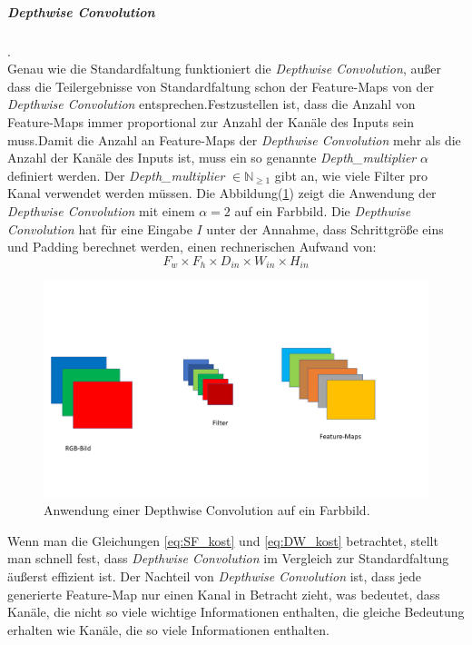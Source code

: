 \documentclass[12pt,a4paper]{scrartcl}
\numberwithin{equation}{section}
\newcommand{\N}{\mathbb{N}} %
\begin{document}
\subparagraph{Depthwise Convolution}.\\
Genau wie die Standardfaltung funktioniert die \textit{Depthwise Convolution}, außer dass die Teilergebnisse von Standardfaltung schon der Feature-Maps von der \textit{Depthwise Convolution} entsprechen.Festzustellen ist, dass die Anzahl von Feature-Maps immer proportional zur Anzahl der Kanäle des Inputs sein muss.Damit die Anzahl an Feature-Maps der \textit{Depthwise Convolution} mehr als die Anzahl der Kanäle des Inputs ist, muss ein so genannte \textit{Depth\_multiplier} $ \alpha $ definiert werden. Der \textit{Depth\_multiplier} $\in \N_{\ge1}$ gibt an, wie viele Filter pro Kanal verwendet werden müssen.  Die Abbildung(\ref{fig:Depthwise_faltung}) zeigt die Anwendung der  \textit{Depthwise Convolution} mit einem  $ \alpha=2 $ auf ein Farbbild.
Die \textit{Depthwise Convolution} hat für eine Eingabe $ I $ unter der Annahme, dass Schrittgröße eins und Padding berechnet werden, einen rechnerischen Aufwand von:
\begin{equation}\label{eq:DW_kost}
	F_w\times F_h \times D_{in}\times W_{in}\times H_{in}
\end{equation}
\begin{figure}[h]
	\includegraphics[width=\textwidth]{Convolution/Folie2}
	\caption{Anwendung einer Depthwise Convolution auf ein Farbbild.}
	\label{fig:Depthwise_faltung}
\end{figure}
Wenn man die Gleichungen \ref{eq:SF_kost} und \ref{eq:DW_kost} betrachtet, stellt man schnell fest, dass \textit{Depthwise Convolution} im Vergleich zur Standardfaltung äußerst effizient ist. Der Nachteil von \textit{Depthwise Convolution} ist, dass jede generierte Feature-Map nur einen Kanal in Betracht zieht, was bedeutet, dass Kanäle, die nicht so viele wichtige Informationen enthalten, die gleiche Bedeutung erhalten wie Kanäle, die so viele Informationen enthalten.  
\end{document}
